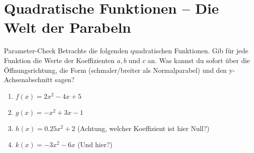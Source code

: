 
\section{Quadratische Funktionen – Die Welt der Parabeln}
\label{sec:quadratische-funktionen_ueberarbeitet}

\begin{aufgabenumgebung}{Parameter-Check}
Betrachte die folgenden quadratischen Funktionen. Gib für jede Funktion die Werte der Koeffizienten $a, b$ und $c$ an. Was kannst du sofort über die Öffnungsrichtung, die Form (schmaler/breiter als Normalparabel) und den y-Achsenabschnitt sagen?
\begin{enumerate}
    \item $f(x) = 2x^2 - 4x + 5$
    \item $g(x) = -x^2 + 3x - 1$
    \item $h(x) = 0.25x^2 + 2$ (Achtung, welcher Koeffizient ist hier Null?)
    \item $k(x) = -3x^2 - 6x$ (Und hier?)
\end{enumerate}
\end{aufgabenumgebung}


